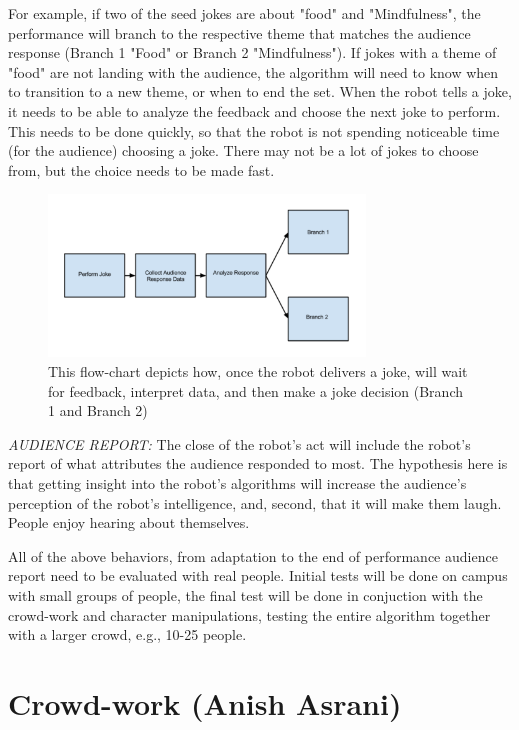 \documentclass[onecolumn, draftclsnofoot,10pt, compsoc]{IEEEtran}
\begin{document}
For example, if two of the seed jokes are about "food" and "Mindfulness", the performance will branch to the respective theme that matches the audience response (Branch 1 "Food" or Branch 2 "Mindfulness"). If jokes with a theme of "food" are not landing with the audience, the algorithm will need to know when to transition to a new theme, or when to end the set. When the robot tells a joke, it needs to be able to analyze the feedback and choose the next joke to perform. This needs to be done quickly, so that the robot is not spending noticeable time (for the audience) choosing a joke. There may not be a lot of jokes to choose from, but the choice needs to be made fast.

\begin{figure}[H]
  \centering
  \includegraphics[width=0.75\textwidth,height=0.75\textheight,keepaspectratio]{fig1}
  \caption{ This flow-chart depicts how, once the robot delivers a joke, will wait for feedback, interpret data, and then make a joke decision (Branch 1 and Branch 2)}
\end{figure}

\textit{AUDIENCE REPORT:} The close of the robot's act will include the robot's report of what attributes the audience responded to most. The hypothesis here is that getting insight into the robot's algorithms will increase the audience's perception of the robot's intelligence, and, second, that it will make them laugh. People enjoy hearing about themselves.

All of the above behaviors, from adaptation to the end of performance audience report need to be evaluated with real people. Initial tests will be done on campus with small groups of people, the final test will be done in conjuction with the crowd-work and character manipulations, testing the entire algorithm together with a larger crowd, e.g., 10-25 people.


\section{Crowd-work (Anish Asrani)}
\end{document}
